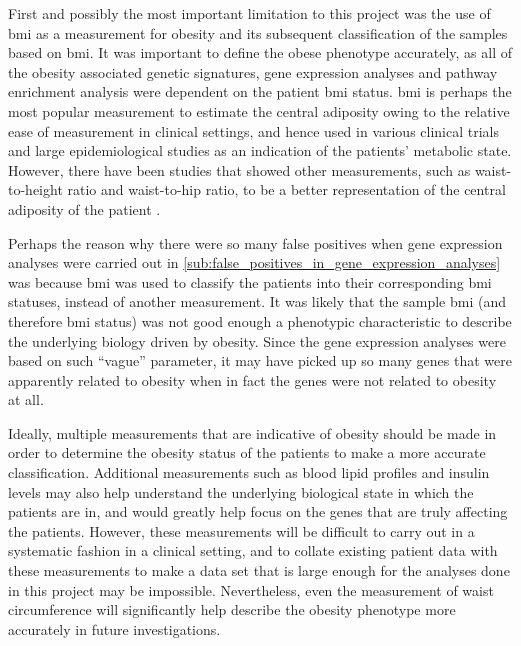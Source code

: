 First and possibly the most important limitation to this project was the use of \gls{bmi} as a measurement for obesity and its subsequent classification of the samples based on \gls{bmi}.
It was important to define the obese phenotype accurately, as all of the obesity associated genetic signatures, gene expression analyses and pathway enrichment analysis were dependent on the patient \gls{bmi} status.
\Gls{bmi} is perhaps the most popular measurement to estimate the central adiposity owing to the relative ease of measurement in clinical settings, and hence used in various clinical trials and large epidemiological studies as an indication of the patients' metabolic state.
However, there have been studies that showed other measurements, such as waist-to-height ratio and waist-to-hip ratio, to be a better representation of the central adiposity of the patient \citep{Dalton2003,Lee2008}.

Perhaps the reason why there were so many false positives when gene expression analyses were carried out in \cref{sub:false_positives_in_gene_expression_analyses} was because \gls{bmi} was used to classify the patients into their corresponding \gls{bmi} statuses, instead of another measurement.
It was likely that the sample \gls{bmi} (and therefore \gls{bmi} status) was not good enough a phenotypic characteristic to describe the underlying biology driven by obesity.
Since the gene expression analyses were based on such ``vague'' parameter, it may have picked up so many genes that were apparently related to obesity when in fact the genes were not related to obesity at all.

Ideally, multiple measurements that are indicative of obesity should be made in order to determine the obesity status of the patients to make a more accurate classification.
Additional measurements such as blood lipid profiles and insulin levels may also help understand the underlying biological state in which the patients are in, and would greatly help focus on the genes that are truly affecting the patients.
However, these measurements will be difficult to carry out in a systematic fashion in a clinical setting, and to collate existing patient data with these measurements to make a data set that is large enough for the analyses done in this project may be impossible.
Nevertheless, even the measurement of waist circumference will significantly help describe the obesity phenotype more accurately in future investigations.

